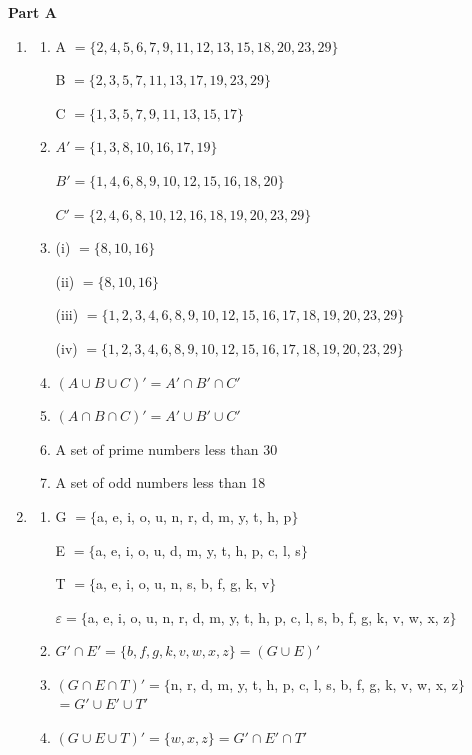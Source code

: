 \noindent\textbf{Part A}
\begin{enumerate}
\item
\begin{enumerate}
  \item[a.] A $= \{2, 4, 5, 6, 7, 9, 11, 12, 13, 15, 18, 20, 23, 29\}$

  B $= \{2, 3, 5, 7, 11, 13, 17, 19, 23, 29\}$

  C $= \{1, 3, 5, 7, 9, 11, 13, 15, 17\}$
  \item[b.] $A' = \{1, 3, 8, 10, 16, 17, 19\}$

  $B' = \{1, 4, 6, 8, 9, 10, 12, 15, 16, 18, 20\}$

  $C' = \{2, 4, 6, 8, 10, 12, 16, 18, 19, 20, 23, 29\}$
  \item[c.] (i) $= \{8, 10, 16\}$

  (ii) $= \{8, 10, 16\}$

  (iii) $= \{1, 2, 3, 4, 6, 8, 9, 10, 12, 15, 16, 17, 18, 19, 20, 23, 29\}$

  (iv) $= \{1, 2, 3, 4, 6, 8, 9, 10, 12, 15, 16, 17, 18, 19, 20, 23, 29\}$
  \item[d.] $(A \cup B \cup C)' = A' \cap B' \cap C'$
  \item[e.] $(A \cap B \cap C)' = A' \cup B' \cup C'$
  \item[f.] A set of prime numbers less than 30
  \item[g.] A set of odd numbers less than 18
\end{enumerate}

\item
\begin{enumerate}
  \item[a.] G $= \{$a, e, i, o, u, n, r, d, m, y, t, h, p$\}$

  E $= \{$a, e, i, o, u, d, m, y, t, h, p, c, l, s$\}$

  T $= \{$a, e, i, o, u, n, s, b, f, g, k, v$\}$

  $\varepsilon = \{$a, e, i, o, u, n, r, d, m, y, t, h, p, c, l, s, b, f, g, k, v, w, x, z$\}$
  \item[b.] $G' \cap E' = \{b, f, g, k, v, w, x, z\} = (G \cup E)'$
  \item[c.] $(G \cap E \cap T)' = \{$n, r, d, m, y, t, h, p, c, l, s, b, f, g, k, v, w, x, z$\}$
  $= G' \cup E' \cup T'$
  \item[d.] $(G \cup E \cup T)' = \{w, x, z\} = G' \cap E' \cap T'$
\end{enumerate}


\end{enumerate}
